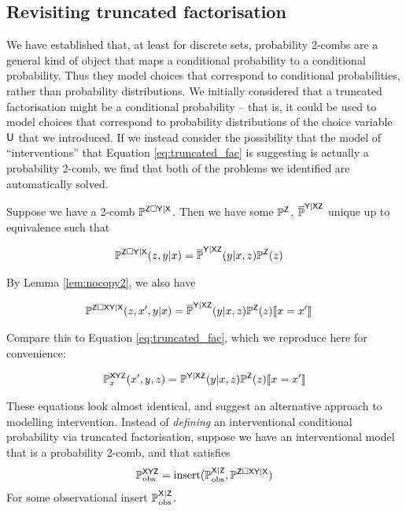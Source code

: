 \subsection{Revisiting truncated factorisation}

We have established that, at least for discrete sets, probability 2-combs are a general kind of object that maps a conditional probability to a conditional probability. Thus they model choices that correspond to conditional probabilities, rather than probability distributions. We initially considered that a truncated factorisation might be a conditional probability -- that is, it could be used to model choices that correspond to probability distributions of the choice variable $\mathsf{U}$ that we introduced. If we instead consider the possibility that the model of ``interventions'' that Equation \ref{eq:truncated_fac} is suggesting is actually a probability 2-comb, we find that both of the problems we identified are automatically solved.

Suppose we have a 2-comb $\mathbb{P}^{\mathsf{Z}\square\mathsf{Y}|\mathsf{X}}$. Then we have some $\mathbb{P}^{\mathsf{Z}}$, $\overline{\mathbb{P}}^{\mathsf{Y}|\mathsf{XZ}}$ unique up to equivalence such that

\begin{align}
	\mathbb{P}^{\mathsf{Z}\square\mathsf{Y}|\mathsf{X}}(z,y|x) &= \overline{\mathbb{P}}^{\mathsf{Y|XZ}}(y|x,z)\mathbb{P}^{\mathsf{Z}}(z)
\end{align}

By Lemma \ref{lem:nocopy2}, we also have

\begin{align}
	\mathbb{P}^{\mathsf{Z}\square\mathsf{XY}|\mathsf{X}}(z,x',y|x) &= \overline{\mathbb{P}}^{\mathsf{Y|XZ}}(y|x,z)\mathbb{P}^{\mathsf{Z}}(z)\llbracket x=x' \rrbracket\label{eq:2comb_cbn}
\end{align}

Compare this to Equation \ref{eq:truncated_fac}, which we reproduce here for convenience:

\begin{align*}
	\mathbb{P}^{\mathsf{XYZ}}_{x}(x',y,z)=\mathbb{P}^{\mathsf{Y|XZ}}(y|x,z)\mathbb{P}^{\mathsf{Z}}(z)\llbracket x=x' \rrbracket
\end{align*}

These equations look almost identical, and suggest an alternative approach to modelling intervention. Instead of \emph{defining} an interventional conditional probability via truncated factorisation, suppose we have an interventional model that is a probability 2-comb, and that satisfies
\begin{align}
	\mathbb{P}_{\text{obs}}^{\mathsf{XYZ}} = \text{insert}(\mathbb{P}_{\text{obs}}^{\mathsf{X}|\mathsf{Z}}, \mathbb{P}^{\mathsf{Z}\square\mathsf{XY}|\mathsf{X}})
\end{align}
For some observational insert $\mathbb{P}_{\text{obs}}^{\mathsf{X}|\mathsf{Z}}$.

